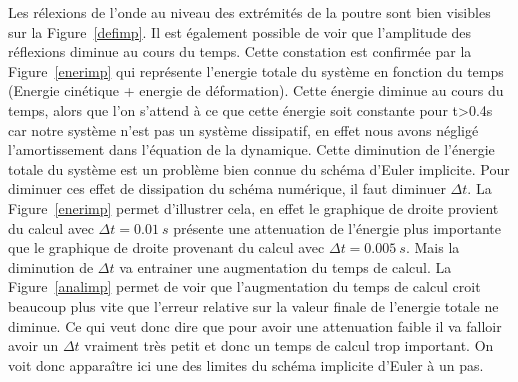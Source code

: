 \documentclass[]{article}
\begin{document}
Les rélexions de l'onde au niveau des extrémités de la poutre sont bien visibles
sur la Figure~\ref{defimp}. Il est également possible de voir que l'amplitude
des réflexions diminue au cours du temps. Cette constation est confirmée par la
Figure~\ref{enerimp} qui représente l'energie totale du système en fonction du
temps (Energie cinétique + energie de déformation). Cette énergie diminue au
cours du temps, alors que l'on s'attend à ce que cette énergie soit constante
pour t>0.4s car notre système n'est pas un système dissipatif, en effet nous
avons négligé l'amortissement dans l'équation de la dynamique. Cette diminution
de l'énergie totale du système est un problème bien connue du schéma d'Euler
implicite. Pour diminuer ces effet de dissipation du schéma numérique, il faut
diminuer $\Delta t$. La Figure~\ref{enerimp} permet d'illustrer cela, en effet
le graphique de droite provient du calcul avec $\Delta t = 0.01\ s$ présente
une attenuation de l'énergie plus importante que le graphique de droite
provenant du calcul avec $\Delta t=0.005\ s$. Mais la diminution de $\Delta t$
va entrainer une augmentation du temps de calcul. La Figure~\ref{analimp}
permet de voir que l'augmentation du temps de calcul croit beaucoup plus vite
que l'erreur relative sur la valeur finale de l'energie totale ne diminue. Ce
qui veut donc dire que pour avoir une attenuation faible il va falloir avoir un
$\Delta t$ vraiment très petit et donc un temps de calcul trop important. On
voit donc apparaître ici une des limites du schéma implicite d'Euler à un pas.
\end{document}
